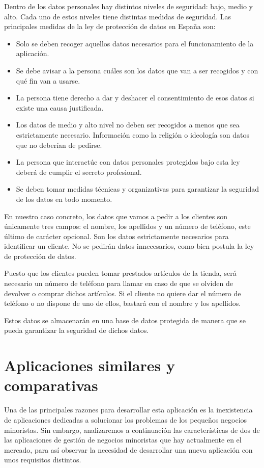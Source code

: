 Dentro de los datos personales hay distintos niveles de seguridad: bajo, medio y alto. Cada uno de estos niveles tiene distintas medidas de seguridad. Las principales medidas de la ley de protección de datos en España son: 
\begin{itemize}
	\item Solo se deben recoger aquellos datos necesarios para el funcionamiento de la aplicación.  
	\item Se debe avisar a la persona cuáles son los datos que van a ser recogidos y con qué fin van a usarse. 
	\item La persona tiene derecho a dar y deshacer el consentimiento de esos datos si existe una causa justificada. 
	\item Los datos de medio y alto nivel no deben ser recogidos a menos que sea estrictamente necesario. Información como la religión o ideología son datos que no deberían de pedirse. 
	\item La persona que interactúe con datos personales protegidos bajo esta ley deberá de cumplir el secreto profesional. 
	\item Se deben tomar medidas técnicas y organizativas para garantizar la seguridad de los datos en todo momento. 
\end{itemize} 

En nuestro caso concreto, los datos que vamos a pedir a los clientes son únicamente tres campos: el nombre, los apellidos y un número de teléfono, este último de carácter opcional. Son los datos estrictamente necesarios para identificar un cliente. No se pedirán datos innecesarios, como bien postula la ley de protección de datos. 

Puesto que los clientes pueden tomar prestados artículos de la tienda, será necesario un número de teléfono para llamar en caso de que se olviden de devolver o comprar dichos artículos. Si el cliente no quiere dar el número de teléfono o no dispone de uno de ellos, bastará con el nombre y los apellidos. 

Estos datos se almacenarán en una base de datos protegida de manera que se pueda garantizar la seguridad de dichos datos. 


\newpage


\section{Aplicaciones similares y comparativas}


Una de las principales razones para desarrollar esta aplicación es la inexistencia de aplicaciones dedicadas a solucionar los problemas de los pequeños negocios minoristas. Sin embargo, analizaremos a continuación las características de dos de las aplicaciones de gestión de negocios minoristas que hay actualmente en el mercado, para así observar la necesidad de desarrollar una nueva aplicación con unos requisitos distintos. \\

